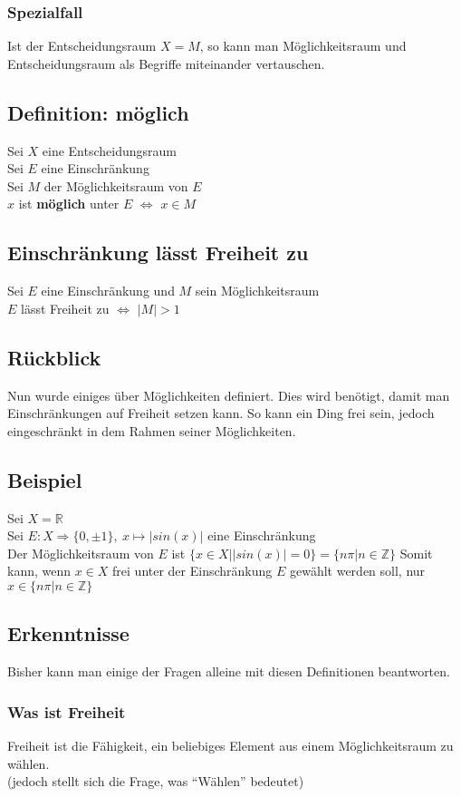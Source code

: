 \documentclass[12pt]{article}
\begin{document}
			\subsubsection{Spezialfall}
				Ist der Entscheidungsraum $X = M$, so kann man
				Möglichkeitsraum und Entscheidungsraum als Begriffe miteinander
				vertauschen.
		\subsection{Definition: möglich}
			Sei $X$ eine Entscheidungsraum\\
			Sei $E$ eine Einschränkung\\
			Sei $M$ der Möglichkeitsraum von $E$\\
			$x$ ist \textbf{möglich} unter $E$ $\Leftrightarrow$ $x \in M$
		\subsection{Einschränkung lässt Freiheit zu}
			Sei $E$ eine Einschränkung und $M$ sein Möglichkeitsraum\\
			$E$ lässt Freiheit zu $\Leftrightarrow$ $|M|>1$
		\subsection{Rückblick}
			Nun wurde einiges über Möglichkeiten definiert. Dies wird
			benötigt, damit man Einschränkungen auf Freiheit setzen kann.
			So kann ein Ding frei sein, jedoch eingeschränkt in
			dem Rahmen seiner Möglichkeiten.
		\subsection{Beispiel}
			Sei $X=\mathbb{R}$\\
			Sei $E:X\Rightarrow \{0,\pm 1\},\> x\mapsto |sin(x)|$ eine Einschränkung\\
			Der Möglichkeitsraum von $E$ ist $\{x \in X | |sin(x)|=0\} = \{n\pi | n\in \mathbb{Z}\}$
			Somit kann, wenn $x \in X$ frei unter der Einschränkung $E$
			gewählt werden soll, nur $x\in \{n\pi | n\in \mathbb{Z}\}$
		\subsection{Erkenntnisse}
			Bisher kann man einige der Fragen alleine mit diesen
			Definitionen beantworten.
			\subsubsection{Was ist Freiheit}
				Freiheit ist die Fähigkeit, ein beliebiges Element aus
				einem Möglichkeitsraum zu wählen.\\
				(jedoch stellt sich die Frage, was ``Wählen'' bedeutet)
\end{document}
